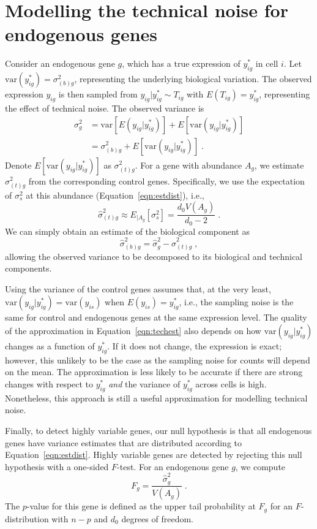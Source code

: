 \documentclass{article}
\begin{document}
\section{Modelling the technical noise for endogenous genes}
Consider an endogenous gene $g$, which has a true expression of $y_{ig}^*$ in cell $i$.
Let $\mbox{var}(y_{ig}^*) = \sigma^2_{(b)g}$, representing the underlying biological variation.
The observed expression $y_{ig}$ is then sampled from $y_{ig}|y_{ig}^* \sim T_{ig}$ with $E(T_{ig}) = y^*_{ig}$, representing the effect of technical noise.
The observed variance is 
\begin{align*}
    \sigma^2_g &= \mbox{var}[E(y_{ig}|y_{ig}^*)] + E[\mbox{var}(y_{ig}|y_{ig}^*)] \\
               &= \sigma^2_{(b)g} +  E[\mbox{var}(y_{ig}|y_{ig}^*)]  \;.
\end{align*}
Denote $E[\mbox{var}(y_{ig}|y_{ig}^*)]$ as $\sigma^2_{(t)g}$.
For a gene with abundance $A_g$, we estimate $\sigma^2_{(t)g}$ from the corresponding control genes.
Specifically, we use the expectation of $\sigma^2_s$ at this abundance (Equation~\ref{eqn:estdist}), i.e., 
\begin{equation}
    \hat\sigma^2_{(t)g} \approx E_{|A_g}[\sigma^2_s] = \frac{d_0V(A_g)}{d_0-2} \;. \label{eqn:techest}
\end{equation}
We can simply obtain an estimate of the biological component as
\[
    \hat\sigma^2_{(b)g} = \hat\sigma^2_g - \hat\sigma^2_{(t)g} \;,
\]
allowing the observed variance to be decomposed to its biological and technical components.

Using the variance of the control genes assumes that, at the very least, $\mbox{var}(y_{ig}|y_{ig}^*) = \mbox{var}(y_{is})$ when $E(y_{is}) = y_{ig}^*$, i.e., the sampling noise is the same for control and endogenous genes at the same expression level.
The quality of the approximation in Equation~\ref{eqn:techest} also depends on how $\mbox{var}(y_{ig}|y_{ig}^*)$ changes as a function of $y^*_{ig}$.
If it does not change, the expression is exact; however, this unlikely to be the case as the sampling noise for counts will depend on the mean.
The approximation is less likely to be accurate if there are strong changes with respect to $y_{ig}^*$ \textit{and} the variance of $y_{ig}^*$ across cells is high.
Nonetheless, this approach is still a useful approximation for modelling technical noise.

Finally, to detect highly variable genes, our null hypothesis is that all endogenous genes have variance estimates that are distributed according to Equation~\ref{eqn:estdist}.
Highly variable genes are detected by rejecting this null hypothesis with a one-sided $F$-test.
For an endogenous gene $g$, we compute
\[
    F_g = \frac{\hat\sigma^2_g}{V(A_g)} \;.
\]
The $p$-value for this gene is defined as the upper tail probability at $F_g$ for an $F$-distribution with $n-p$ and $d_0$ degrees of freedom.
\end{document}
